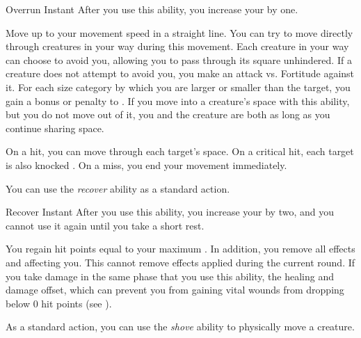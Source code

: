         \begin{instantability}{Overrun}
            \label{Overrun}
            Instant
            \rankline
            After you use this ability, you increase your  by one.

            Move up to your movement speed in a straight line.
            You can try to move directly through creatures in your way during this movement.
            Each creature in your way can choose to avoid you, allowing you to pass through its square unhindered.
            If a creature does not attempt to avoid you, you make an attack vs. Fortitude against it.
            For each size category by which you are larger or smaller than the target, you gain a  bonus or penalty to .
            If you move into a creature's space with this ability, but you do not move out of it, you and the creature are both \squeezing as long as you continue sharing space.

            On a hit, you can move through each target's space.
            On a critical hit, each target is also knocked \prone.
            On a miss, you end your movement immediately.
        \end{instantability}

         You can use the \textit{recover} ability as a standard action.
        \begin{instantability}{Recover}
            \label{Recover}
            Instant
            \rankline
            After you use this ability, you increase your  by two, and you cannot use it again until you take a short rest.

            You regain hit points equal to your maximum .
            In addition, you remove all  effects and  affecting you.
            This cannot remove effects applied during the current round.
            If you take damage in the same phase that you use this ability, the healing and damage offset, which can prevent you from gaining vital wounds from dropping below 0 hit points (see ).
        \end{instantability}

         As a standard action, you can use the \textit{shove} ability to physically move a creature.

